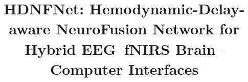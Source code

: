 \documentclass[preprint,12pt,authoryear]{elsarticle}
\begin{document}
\begin{frontmatter}



\title{HDNFNet: Hemodynamic-Delay-aware NeuroFusion Network for Hybrid EEG--fNIRS Brain--Computer Interfaces} %


\author{} %



\end{frontmatter}
\end{document}
